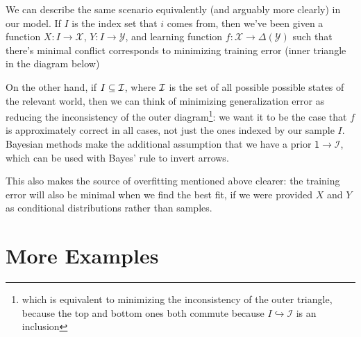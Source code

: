 \documentclass{article}
\begin{document}
	We can describe the same scenario equivalently (and arguably more clearly) in our model. If $I$ is the index set that $i$ comes from, then we've been given a function $X : I \to \mathcal X$, $Y: I \to \mathcal Y$, and learning function $f : \mathcal X \to \Delta(\mathcal Y)$ such that there's minimal conflict corresponds to minimizing training error (inner triangle in the diagram below)
	
	\begin{center}
	\end{center}

	On the other hand, if $I \subseteq \cal I$, where $\cal I$ is the set of all possible possible states of the relevant world, then we can think of minimizing generalization error as reducing the inconsistency of the outer diagram\footnote{which is equivalent to minimizing the inconsistency of the outer triangle, because the top and bottom ones both commute because $I \hookrightarrow \mathcal I$ is an inclusion}: we want it to be the case that $f$ is approximately correct in all cases, not just the ones indexed by our sample $I$.  Bayesian methods make the additional assumption that we have a prior $\mathsf 1 \to \mathcal I$, which can be used with Bayes' rule to invert arrows.
	
	This also makes the source of overfitting mentioned above clearer: the training error will also be minimal when we find the best fit, if we were provided $X$ and $Y$ as conditional distributions rather than samples.
	
	

	\section{More Examples}
\end{document}
